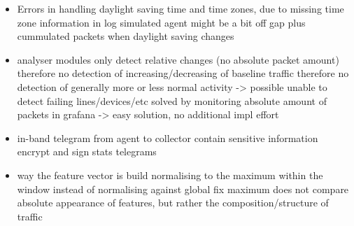 
\begin{itemize}
	\item Errors in handling daylight saving time and time zones, due to missing time zone information in log
		\subitem simulated agent might be a bit off
		\subitem gap plus cummulated packets when daylight saving changes
	\item analyser modules only detect relative changes (no absolute packet amount)
		\subitem therefore no detection of increasing/decreasing of baseline traffic
		\subitem therefore no detection of generally more or less normal activity -> possible unable to detect failing lines/devices/etc
		\subitem solved by monitoring absolute amount of packets in \gls{grafana} -> easy solution, no additional impl effort
	\item in-band telegram from agent to collector contain sensitive information
		\subitem encrypt and sign stats telegrams
		
	\item way the feature vector is build
		\subitem normalising to the maximum within the window
		\subitem instead of normalising against global fix maximum
		\subitem does not compare absolute appearance of features, but rather the composition/structure of traffic
		
\end{itemize}
